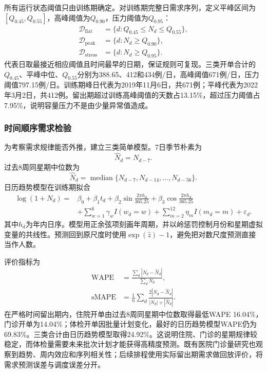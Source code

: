 所有运行状态阈值只由训练期确定。对训练期完整日需求序列，定义平峰区间为$[Q_{0.45},Q_{0.55}]$，高峰阈值为$Q_{0.90}$，压力阈值为$Q_{0.95}$：
\begin{align}
\mathcal D_{\mathrm{flat}}&=\{d:Q_{0.45}\le N_d\le Q_{0.55}\},\\
\mathcal D_{\mathrm{peak}}&=\{d:N_d\ge Q_{0.90}\},\\
\mathcal D_{\mathrm{stress}}&=\{d:N_d\ge Q_{0.95}\}.
\end{align}
代表日取最接近相应阈值且时间最早的日期，保证规则可复现。三类开单合计的$Q_{0.45}$、平峰中位、$Q_{0.55}$分别为388.65、412和434例/日，高峰阈值671例/日，压力阈值797.15例/日。训练期峰日代表为2019年11月6日，共671例；平峰代表为2022年3月2日，共412例。留出期超过训练高峰阈值的天数占13.15\%，超过压力阈值占7.95\%，说明容量压力不是由少量异常值造成。

\subsubsection{时间顺序需求检验}

为考察需求规律能否外推，建立三类简单模型。7日季节朴素为
\begin{equation}
\widehat N_d=N_{d-7}.
\end{equation}
过去8周同星期中位数为
\begin{equation}
\widehat N_d=\operatorname{median}\{N_{d-7},N_{d-14},\ldots,N_{d-56}\}.
\end{equation}
日历趋势模型在训练期拟合
\begin{equation}
\begin{aligned}
\log(1+N_d)={}&\beta_0+\beta_1 t_d
+\beta_2\sin\frac{2\pi h_d}{365.25}+\beta_3\cos\frac{2\pi h_d}{365.25}\\
&+\sum_{w=1}^{6}\gamma_w I(w_d=w)
+\sum_{m=2}^{12}\eta_m I(m_d=m)+\varepsilon_d.
\end{aligned}
\end{equation}
其中$h_d$为年内日序。模型用正余弦项刻画年周期，并以岭惩罚控制月份和星期虚拟变量的共线性。预测回到原尺度时使用$\exp(\widehat z)-1$，避免把对数尺度预测直接当作人数。

评价指标为
\begin{align}
\mathrm{WAPE}&=\frac{\sum_d|N_d-\widehat N_d|}{\sum_dN_d},\\
\mathrm{sMAPE}&=\frac1n\sum_d\frac{2|N_d-\widehat N_d|}{|N_d|+|\widehat N_d|}.
\end{align}
在严格时间留出期内，住院开单由过去8周同星期中位数取得最低WAPE 16.04\%，门诊开单为14.04\%；体检开单因批量计划变化，最好的日历趋势模型WAPE仍为69.83\%。三类合计由日历趋势模型取得24.92\%。这说明住院、门诊的星期规律较稳定，而体检量需要未来批次计划才能获得高精度预测。既有医院门诊量研究也观察到趋势、周内效应和序列相关性\cite{zhu2015,xiang2009,luo2017}；后续排程使用实际留出期需求做回放评价，将需求预测误差与调度误差分开。

